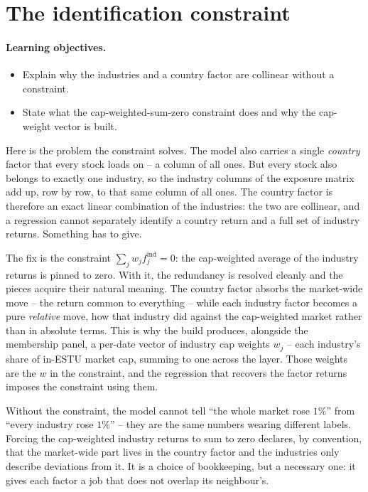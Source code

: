 \documentclass[11pt]{article}
\theoremstyle{definition}
\theoremstyle{plain}
\theoremstyle{remark}
\begin{document}
\section{The identification constraint}\label{sec:constraint}

\paragraph{Learning objectives.}
\begin{itemize}[leftmargin=1.4em,topsep=2pt]
  \item Explain why the industries and a country factor are collinear without a constraint.
  \item State what the cap-weighted-sum-zero constraint does and why the cap-weight vector is built.
\end{itemize}

Here is the problem the constraint solves. The model also carries a single \emph{country} factor that every stock loads on -- a column of all ones. But every stock also belongs to exactly one industry, so the industry columns of the exposure matrix add up, row by row, to that same column of all ones. The country factor is therefore an exact linear combination of the industries: the two are collinear, and a regression cannot separately identify a country return and a full set of industry returns. Something has to give.

The fix is the constraint $\sum_j w_j f^{\text{ind}}_j = 0$: the cap-weighted average of the industry returns is pinned to zero. With it, the redundancy is resolved cleanly and the pieces acquire their natural meaning. The country factor absorbs the market-wide move -- the return common to everything -- while each industry factor becomes a pure \emph{relative} move, how that industry did against the cap-weighted market rather than in absolute terms. This is why the build produces, alongside the membership panel, a per-date vector of industry cap weights $w_j$ -- each industry's share of in-ESTU market cap, summing to one across the layer. Those weights are the $w$ in the constraint, and the regression that recovers the factor returns imposes the constraint using them.

\begin{intuition}
Without the constraint, the model cannot tell ``the whole market rose $1\%$'' from ``every industry rose $1\%$'' -- they are the same numbers wearing different labels. Forcing the cap-weighted industry returns to sum to zero declares, by convention, that the market-wide part lives in the country factor and the industries only describe deviations from it. It is a choice of bookkeeping, but a necessary one: it gives each factor a job that does not overlap its neighbour's.
\end{intuition}
\end{document}
